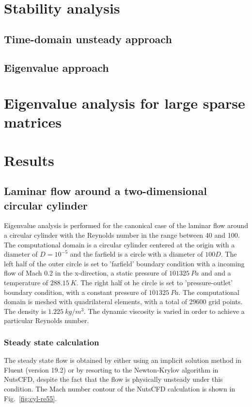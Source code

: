 \documentclass[journal,final]{new-aiaa}
\begin{document}
\section{Stability analysis}
\subsection{Time-domain unsteady approach}
\subsection{Eigenvalue approach}
\section{Eigenvalue analysis for large sparse matrices}

\section{Results}
\label{results}

\subsection{Laminar flow around a two-dimensional circular cylinder}
Eigenvalue analysis is performed for the canonical case of the
laminar flow around a circular cylinder with the Reynolds number in
the range between 40 and 100. The computational domain is a
circular cylinder centered at the origin with a diameter of $D=10^{-5}$
and the farfield is a circle with a diameter of $100D$. The left half of
the outer circle is set to 'farfield' boundary condition with a incoming
flow of Mach 0.2 in the x-direction, a static pressure of $101325~Pa$ and
and a temperature of $288.15~K$.
The right half ot he circle is set to 'pressure-outlet' boundary condition,
with a constant pressure of $101325~Pa$.
The computational domain is meshed with quadrilateral elements,
with a total of 29600 grid points. The density is $1.225~kg/m^3$.
The dynamic viscosity is varied in order to achieve a particular Reynolds number.

\subsubsection{Steady state calculation}
The steady state flow is obtained by either using an implicit solution method in
Fluent (version 19.2) or by resorting to the Newton-Krylov algorithm in NutsCFD,
despite the fact that the flow is physically unsteady under this condition. The
Mach number contour of the NutsCFD calculation is shown in Fig.~\ref{fig:cyl-re55}.
\end{document}
